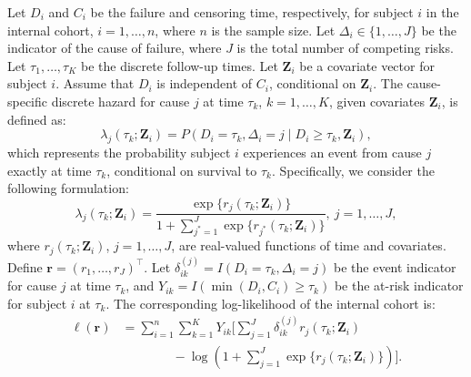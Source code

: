 \documentclass{article}
\theoremstyle{plain}
\theoremstyle{definition}
\theoremstyle{remark}
\begin{document}
Let $D_i$ and $C_i$ be the failure and censoring time, respectively, for subject $i$ in the internal cohort, $i=1, \ldots, n$, where $n$ is the sample size. Let $\Delta_i \in \{1, \ldots, J\}$ be the indicator of the cause of failure, where $J$ is the total number of competing risks. Let $\tau_1, \ldots, \tau_K$ be the discrete follow-up times. Let $\boldsymbol Z_i$ be a covariate vector for subject $i$. Assume that $D_i$ is independent of $C_i$, conditional on $\boldsymbol Z_i$. The cause-specific discrete hazard  \citep{kalbfleisch2002statistical} for cause $j$ at time $\tau_k$, $k=1, \ldots, K$, given covariates $\mathbf{Z}_i$, is defined as:
\begin{equation*}
    \lambda_j(\tau_k; \bm{Z}_i) = P(D_i = \tau_k, \Delta_i = j \mid D_i \ge \tau_k, \bm{Z}_i),
\end{equation*}
which represents the probability subject $i$ experiences an event from cause $j$ exactly at time $\tau_k$, conditional on survival to $\tau_k$.  Specifically,  we consider the following  formulation:  
\begin{equation*}
    \lambda_j(\tau_k;\boldsymbol{Z}_{i}) = \frac{\exp\{r_j(\tau_k;\boldsymbol{Z}_{i})\}}{1+\sum_{j^*=1}^J\exp\{r_{j^*}(\tau_k;\boldsymbol{Z}_{i})\}},~j=1, \ldots, J,
\end{equation*}
where  $r_j(\tau_k;\boldsymbol{Z}_{i})$, $j=1, \ldots, J$, are real-valued  functions of time and covariates. Define $\boldsymbol{r}=(r_1, \ldots, r_J)^\top$. Let $\delta_{ik}^{(j)} = I(D_i = \tau_k, \Delta_i = j)$ be the event indicator for cause $j$ at time $\tau_k$, and  $Y_{ik}=I(\min(D_i, C_i) \ge \tau_k)$ be the at-risk indicator for subject $i$ at $\tau_k$. The corresponding log-likelihood of the internal cohort is:
\begin{align}
\ell(\boldsymbol r)
&=
\sum_{i=1}^n \sum_{k=1}^{K} Y_{ik}
\Bigg[
    \sum_{j=1}^J
    \delta_{ik}^{(j)} r_j(\tau_k;\boldsymbol Z_i)
\nonumber\\
&\qquad\qquad
    - \log\!\left(
        1 + \sum_{j=1}^J
        \exp\{ r_j(\tau_k;\boldsymbol Z_i) \}
      \right)
\Bigg].
\label{log l hazard competing}
\end{align}
\end{document}
